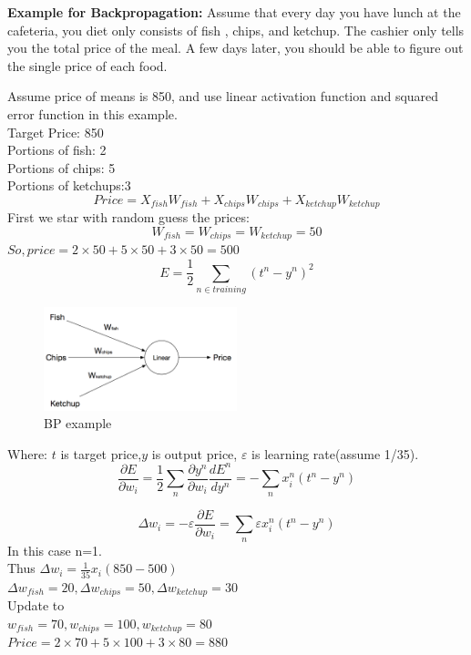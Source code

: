 \documentclass[12pt,a4paper]{report}
\begin{document}
\textbf{Example for Backpropagation:}
Assume that every day you have lunch at the cafeteria, you diet only consists of fish , chips, and ketchup. The cashier only tells you the total price of the meal. A few days later, you should be able to figure out the single price of each food.

Assume price of means is 850, and use linear activation function and squared error function in this example.\\
Target Price: 850\\
Portions of fish: 2\\
Portions of chips: 5\\
Portions of ketchups:3\\
\[Price=X_{fish} W_{fish}+X_{chips}W_{chips}+X_{ketchup}W_{ketchup}\]
First we star with random guess the prices:
\[W_{fish}=W_{chips}=W_{ketchup}=50\]
$So,price=2\times 50+5\times 50+3\times 50=500$
\[E=\frac{1}{2} \sum\limits_{n\in training}(t^n-y^n)^2\]

\begin{figure}[h]
\centering
\includegraphics[width=0.5\textwidth]{bp.png}
\caption{BP example }
\end{figure}
\newpage
Where:
$t$ is target price,$y$ is output price, $\varepsilon$ is learning rate(assume 1/35).
\[\frac{\partial{E}}{\partial{w_i}}=\frac{1}{2}\sum\limits_n\frac{\partial{y^n}}{\partial{w_i}}\frac{d{E^n}}{d{y^n}} =-\sum\limits_n x_i^n(t^n-y^n)\]

\[\Delta w_i=-\varepsilon\frac{\partial E}{\partial w_i}=\sum\limits_n \varepsilon x_i^n(t^n-y^n)\]
In this case n=1.\\
Thus $ \Delta w_i =\frac{1}{35}x_i(850-500)$\\

$\Delta w_{fish}=20,\Delta w_{chips}=50,\Delta w_{ketchup}=30$   \\

Update to\\

$w_{fish}=70,w_{chips}=100,w_{ketchup}=80$  \\

$ Price=2\times 70+5\times 100+3\times 80=880$\\
 
\end{document}
